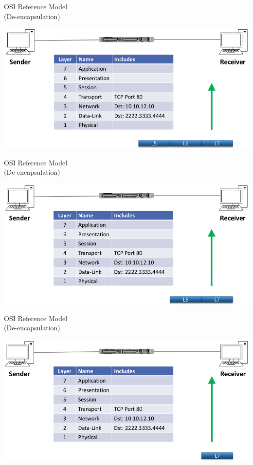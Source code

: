 \documentclass[pdflatex,compress,mathserif]{beamer}
\begin{document}
\begin{frame}{OSI Reference Model\\(De-encapsulation)}
	\begin{center}
		\includegraphics[width=\linewidth]{img/img59}
	\end{center}
\end{frame}

\begin{frame}{OSI Reference Model\\(De-encapsulation)}
	\begin{center}
		\includegraphics[width=\linewidth]{img/img60}
	\end{center}
\end{frame}

\begin{frame}{OSI Reference Model\\(De-encapsulation)}
	\begin{center}
		\includegraphics[width=\linewidth]{img/img61}
	\end{center}
\end{frame}
\end{document}
